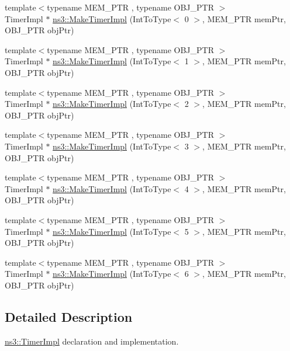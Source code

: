 \begin{DoxyCompactItemize}
\item 
{\footnotesize template$<$typename M\+E\+M\+\_\+\+P\+TR , typename O\+B\+J\+\_\+\+P\+TR $>$ }\\Timer\+Impl $\ast$ \hyperlink{group__timerimpl_ga189516cfbc46659ce05183c9bb4f0a53}{ns3\+::\+Make\+Timer\+Impl} (Int\+To\+Type$<$ 0 $>$, M\+E\+M\+\_\+\+P\+TR mem\+Ptr, O\+B\+J\+\_\+\+P\+TR obj\+Ptr)
\item 
{\footnotesize template$<$typename M\+E\+M\+\_\+\+P\+TR , typename O\+B\+J\+\_\+\+P\+TR $>$ }\\Timer\+Impl $\ast$ \hyperlink{group__timerimpl_ga1f4bce6c34cdc484fb7e94e47f87f7fd}{ns3\+::\+Make\+Timer\+Impl} (Int\+To\+Type$<$ 1 $>$, M\+E\+M\+\_\+\+P\+TR mem\+Ptr, O\+B\+J\+\_\+\+P\+TR obj\+Ptr)
\item 
{\footnotesize template$<$typename M\+E\+M\+\_\+\+P\+TR , typename O\+B\+J\+\_\+\+P\+TR $>$ }\\Timer\+Impl $\ast$ \hyperlink{group__timerimpl_ga088865b78dbf7be93f27c8179a163fff}{ns3\+::\+Make\+Timer\+Impl} (Int\+To\+Type$<$ 2 $>$, M\+E\+M\+\_\+\+P\+TR mem\+Ptr, O\+B\+J\+\_\+\+P\+TR obj\+Ptr)
\item 
{\footnotesize template$<$typename M\+E\+M\+\_\+\+P\+TR , typename O\+B\+J\+\_\+\+P\+TR $>$ }\\Timer\+Impl $\ast$ \hyperlink{group__timerimpl_gaba31064449f41752f5cbf720d067de4f}{ns3\+::\+Make\+Timer\+Impl} (Int\+To\+Type$<$ 3 $>$, M\+E\+M\+\_\+\+P\+TR mem\+Ptr, O\+B\+J\+\_\+\+P\+TR obj\+Ptr)
\item 
{\footnotesize template$<$typename M\+E\+M\+\_\+\+P\+TR , typename O\+B\+J\+\_\+\+P\+TR $>$ }\\Timer\+Impl $\ast$ \hyperlink{group__timerimpl_ga2670f9b42fcaf92d263baceb00ef9c11}{ns3\+::\+Make\+Timer\+Impl} (Int\+To\+Type$<$ 4 $>$, M\+E\+M\+\_\+\+P\+TR mem\+Ptr, O\+B\+J\+\_\+\+P\+TR obj\+Ptr)
\item 
{\footnotesize template$<$typename M\+E\+M\+\_\+\+P\+TR , typename O\+B\+J\+\_\+\+P\+TR $>$ }\\Timer\+Impl $\ast$ \hyperlink{group__timerimpl_ga007db2f67c4d184c2e6591e1b2e5815e}{ns3\+::\+Make\+Timer\+Impl} (Int\+To\+Type$<$ 5 $>$, M\+E\+M\+\_\+\+P\+TR mem\+Ptr, O\+B\+J\+\_\+\+P\+TR obj\+Ptr)
\item 
{\footnotesize template$<$typename M\+E\+M\+\_\+\+P\+TR , typename O\+B\+J\+\_\+\+P\+TR $>$ }\\Timer\+Impl $\ast$ \hyperlink{group__timerimpl_ga5aff48e5186a6d90b65835697e6719bf}{ns3\+::\+Make\+Timer\+Impl} (Int\+To\+Type$<$ 6 $>$, M\+E\+M\+\_\+\+P\+TR mem\+Ptr, O\+B\+J\+\_\+\+P\+TR obj\+Ptr)
\end{DoxyCompactItemize}


\subsection{Detailed Description}
\hyperlink{classns3_1_1TimerImpl}{ns3\+::\+Timer\+Impl} declaration and implementation. 
